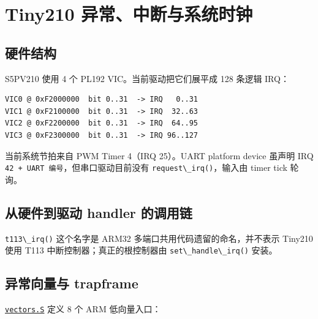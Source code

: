 \chapter{Tiny210
异常、中断与系统时钟}\label{tiny210-ux5f02ux5e38ux4e2dux65adux4e0eux7cfbux7edfux65f6ux949f}

\section{硬件结构}\label{ux786cux4ef6ux7ed3ux6784}

S5PV210 使用 4 个 PL192 VIC。当前驱动把它们展平成 128 条逻辑 IRQ：

\begin{lstlisting}
VIC0 @ 0xF2000000  bit 0..31  -> IRQ   0..31
VIC1 @ 0xF2100000  bit 0..31  -> IRQ  32..63
VIC2 @ 0xF2200000  bit 0..31  -> IRQ  64..95
VIC3 @ 0xF2300000  bit 0..31  -> IRQ 96..127
\end{lstlisting}

当前系统节拍来自 PWM Timer 4（IRQ 25）。UART platform device 虽声明 IRQ
\passthrough{\lstinline!42 + UART 编号!}，但串口驱动目前没有
\passthrough{\lstinline!request\_irq()!}，输入由 timer tick 轮询。

\section{从硬件到驱动 handler
的调用链}\label{ux4eceux786cux4ef6ux5230ux9a71ux52a8-handler-ux7684ux8c03ux7528ux94fe}



\passthrough{\lstinline!t113\_irq()!} 这个名字是 ARM32
多端口共用代码遗留的命名，并不表示 Tiny210 使用 T113
中断控制器；真正的根控制器由
\passthrough{\lstinline!set\_handle\_irq()!} 安装。

\section{异常向量与
trapframe}\label{ux5f02ux5e38ux5411ux91cfux4e0e-trapframe}

\href{../../../kernel/arch/arm/vectors.S}{\passthrough{\lstinline!vectors.S!}}
定义 8 个 ARM 低向量入口：

